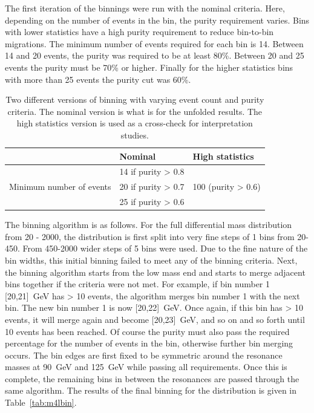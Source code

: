 The first iteration of the binnings were run with the nominal criteria. Here, depending on the number of events in the bin, the purity requirement varies. Bins with lower statistics have a high purity requirement to reduce bin-to-bin migrations. The minimum number of events required for each bin is 14. Between 14 and 20 events, the purity was required to be at least 80\%. Between 20 and 25 events the purity must be 70\% or higher. Finally for the higher statistics bins with more than 25 events the purity cut was 60\%. 

\begin{table}[bp]
  \begin{tabular}{c | ll}
  \hline
                & Nominal              & High statistics             \\
    \midrule
                                & 14 if purity > 0.8 &   \\
     Minimum number of events & 20 if purity > 0.7 & 100 (purity > 0.6)  \\
                                &25 if purity > 0.6 &    \\
    \hline
  \end{tabular}
  \caption{Two different versions of binning with varying event count and purity criteria. The nominal version is what is for the unfolded results. The high statistics version is used as a cross-check for interpretation studies.}
  \label{tab:BinningVersions}
\end{table}

The binning algorithm is as follows. For the full \mFourL{} differential mass distribution from \unit{20}{\Gev} - \unit{2000}{\GeV}, the distribution is first split into very fine steps of \unit{1}{\GeV} bins from \unit{20}{\Gev}-\unit{450}{\GeV}. From \unit{450}{\Gev}-\unit{2000}{\GeV} wider steps of \unit{5}{\GeV} bins were used. Due to the fine nature of the bin widths, this initial binning failed to meet any of the binning criteria. Next, the binning algorithm starts from the low mass end and starts to merge adjacent bins together if the criteria were not met. For example, if bin number 1 [20,21]~GeV has > 10 events, the algorithm merges bin number 1 with the next bin. The new bin number 1 is now [20,22]~GeV. Once again, if this bin has > 10 events, it will merge again and become [20,23]~GeV, and so on and so forth until 10 events has been reached. Of course the purity must also pass the required percentage for the number of events in the bin, otherwise further bin merging occurs. The bin edges are first fixed to be symmetric around the resonance masses at 90~GeV and 125~GeV while passing all requirements. Once this is complete, the remaining bins in between the resonances are passed through the same algorithm. The results of the final binning for the \mFourL{} distribution is given in Table~\ref{tab:m4lbin}.

